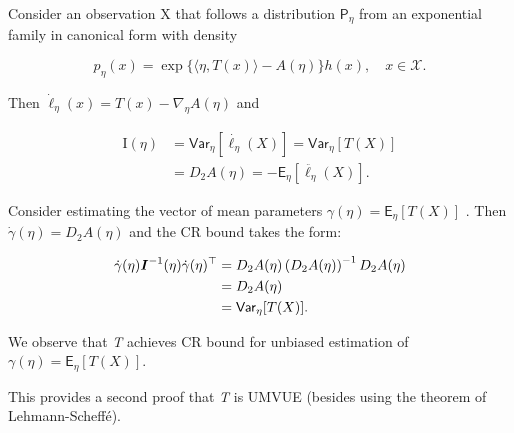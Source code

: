 \begin{ex}
    
Consider an observation X that follows a distribution \(\mathsf{P}_{\eta}\) from
an exponential family in canonical form with density

\[p_{\eta}(x) = \exp \{ \langle \eta, T(x) \rangle - A(\eta) \} h(x), \quad x \in \mathcal{X}.\]

Then \(\dot{\ell}_{\eta}(x) = T(x) - \nabla_{\eta} A(\eta)\) and

\[
	\begin{split} \mathrm{I}(\eta) &= \mathsf{Var}_{\eta}[\dot{\ell_{\eta}}(X)] = \mathsf{Var}_{\eta}[T(X)] \\ &= D_2 A(\eta) = -\mathsf{E}_{\eta}[\ddot{\ell_{\eta}}(X)]. \end{split}
\]

Consider estimating the vector of mean parameters
\(\gamma(\eta) = \mathsf{E}_{\eta}[T(X)]\) . Then
\(\dot{\gamma}(\eta) = D_2 A(\eta)\) and the CR bound takes the form:

\begin{align*}
    \dot{\gamma}(\eta)\boldsymbol{I}^{-1}(\eta)\dot{\gamma}(\eta)^{\top} &= D_2 A(\eta) \left(D_2 A(\eta)\right)^{-1} D_2 A(\eta)\\
                                                                 &= D_2 A(\eta) 
                                                               \\&= \mathsf{Var}_{\eta}[T(X)].
\end{align*}

We observe that \emph{T} achieves CR bound for unbiased estimation of
\(\gamma(\eta) = \mathsf{E}_{\eta}[T(X)]\).

This provides a second proof that \emph{T} is UMVUE (besides using the
theorem of Lehmann-Scheffé).
\end{ex}

